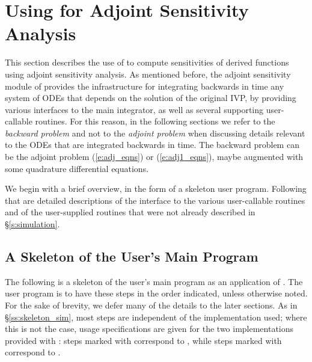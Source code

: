 \chapter{Using {\cvodes} for Adjoint Sensitivity Analysis}\label{s:adjoint}

This section describes the use of {\cvodes} to compute sensitivities of derived 
functions using adjoint sensitivity analysis. As mentioned before, the adjoint
sensitivity module of {\cvodes} provides the infrastructure for integrating
backwards in time any system of ODEs that depends on the solution of the original
IVP, by providing various interfaces to the main {\cvodes} integrator, as well 
as several supporting user-callable routines. For this reason, in the following
sections we refer to the {\em backward problem} and not to the 
{\em adjoint problem} when discussing details relevant to the ODEs that
are integrated backwards in  time. The backward problem can be the adjoint problem
(\ref{e:adj_eqns}) or (\ref{e:adj1_eqns}),
maybe augmented with some quadrature differential equations.

We begin with a brief overview, in the form of a skeleton user program.
Following that are detailed descriptions of the interface to the
various user-callable routines and of the user-supplied routines that were not already
described in \S\ref{s:simulation}.
\section{A Skeleton of the User's Main Program}\label{ss:skeleton_adj}

The following is a skeleton of the user's main program as an application of
{\cvodes}. The user program is to have these steps in the order indicated, 
unless otherwise noted. For the sake of brevity, we defer many of the details to 
the later sections.
As in \S\ref{ss:skeleton_sim}, most steps are independent of the {\nvector}
implementation used; where this is not the case, usage specifications are given for the
two implementations provided with {\cvodes}: steps marked with {\p} correspond to 
{\nvecp}, while steps marked with {\s} correspond to {\nvecs}.

